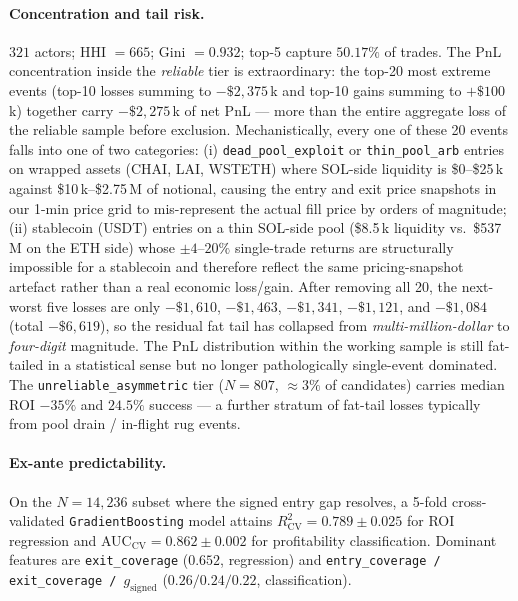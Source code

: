 \documentclass[sigconf,nonacm,10pt]{acmart}
\newcommand{\gsigned}{g_{\text{signed}}}
\begin{document}
\paragraph{Concentration and tail risk.} $321$ actors; HHI $=665$;
Gini $=0.932$; top-5 capture $50.17\%$ of trades. The PnL
concentration inside the \emph{reliable} tier is extraordinary:
the top-20 most extreme events (top-10 losses summing to
$-\$2{,}375$\,k and top-10 gains summing to $+\$100$\,k) together
carry $-\$2{,}275$\,k of net PnL --- more than the entire
aggregate loss of the reliable sample before exclusion.
Mechanistically, every one of these 20 events falls into one of
two categories: (i) \texttt{dead\allowbreak\_pool\allowbreak\_exploit}
or \texttt{thin\allowbreak\_pool\allowbreak\_arb} entries on
wrapped assets (CHAI, LAI, WSTETH) where SOL-side liquidity is
\$0--\$25\,k against \$10\,k--\$2.75\,M of notional, causing the
entry and exit price snapshots in our 1-min price grid to
mis-represent the actual fill price by orders of magnitude;
(ii) stablecoin (USDT) entries on a thin SOL-side pool
(\$8.5\,k liquidity vs.\ \$537\,M on the ETH side) whose
$\pm\!4$--$20\%$ single-trade returns are structurally impossible
for a stablecoin and therefore reflect the same pricing-snapshot
artefact rather than a real economic loss/gain. After removing
all 20, the next-worst five losses are only $-\$1{,}610$,
$-\$1{,}463$, $-\$1{,}341$, $-\$1{,}121$, and $-\$1{,}084$
(total $-\$6{,}619$), so the residual fat tail has collapsed
from \emph{multi-million-dollar} to \emph{four-digit} magnitude.
The PnL distribution within the working sample is still
fat-tailed in a statistical sense but no longer pathologically
single-event dominated. The
\texttt{unreliable\allowbreak\_asymmetric} tier ($N=807$,
$\approx\!3\%$ of candidates) carries median ROI $-35\%$ and $24.5\%$
success --- a further stratum of fat-tail losses typically from
pool drain / in-flight rug events.

\paragraph{Ex-ante predictability.} On the $N=14{,}236$ subset where the
signed entry gap resolves, a 5-fold cross-validated
\texttt{GradientBoosting} model attains $R^{2}_{\text{CV}} = 0.789 \pm
0.025$ for ROI regression and AUC$_{\text{CV}} = 0.862 \pm 0.002$ for
profitability classification. Dominant features are \texttt{exit\_coverage}
($0.652$, regression) and \texttt{entry\_coverage / exit\_coverage /
$\gsigned$} ($0.26 / 0.24 / 0.22$, classification).
\end{document}
